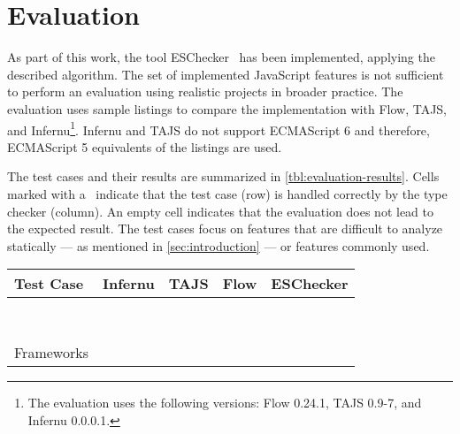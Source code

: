 \section{Evaluation}\label{sec:evaluation}
As part of this work, the tool ESChecker~\cite{Reiser2016} has been implemented, applying the described algorithm. The set of implemented JavaScript features is not sufficient to perform an evaluation using realistic projects in broader practice. The evaluation uses sample listings to compare the implementation with Flow, TAJS, and Infernu\footnote{The evaluation uses the following versions: Flow 0.24.1, TAJS 0.9-7, and Infernu 0.0.0.1.}. Infernu and TAJS do not support ECMAScript 6 and therefore, ECMAScript 5 equivalents of the listings are used. 

The test cases and their results are summarized in \cref{tbl:evaluation-results}. Cells marked with a \checkmark~indicate that the test case (row) is handled correctly by the type checker (column). An empty cell indicates that the evaluation does not lead to the expected result. The test cases focus on features that are difficult to analyze statically --- as mentioned in \cref{sec:introduction} --- or features commonly used.


\begin{table*}
	\centering
	\begin{tabular}{@{}l c c c c@{}}\toprule
	Test Case & Infernu & TAJS & Flow & ESChecker \\ \midrule
	\nameref{ssec:variable-redefinement} &  & \checkmark & \checkmark & \checkmark \\
	\nameref{ssec:closures} & \checkmark & \checkmark & \checkmark & \checkmark \\
	\nameref{ssec:side-effects} & & \checkmark & & \checkmark \\ 
	\nameref{ssec:function-overloading} & & \checkmark & \checkmark & \checkmark \\ 
	\nameref{ssec:callbacks} & \checkmark & \checkmark &  & \checkmark \\ 
	\nameref{ssec:built-in-types} & & & \checkmark & \checkmark \\ 
	\nameref{ssec:dynamic-object-manipulation} & & \checkmark & & \\ 
	\nameref{ssec:dom-events} & & \checkmark & & \\ 
	Frameworks & & & & \\ \bottomrule
	\end{tabular}
	\caption{Evaluation Results}
	\label{tbl:evaluation-results}
\end{table*}


